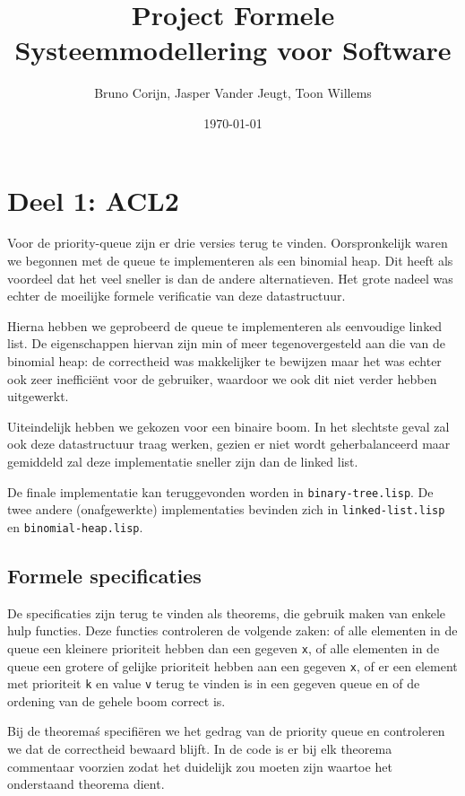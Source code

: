 \documentclass[a4paper,10pt]{article}
\title{Project Formele Systeemmodellering voor Software}
\author{Bruno Corijn, Jasper Vander Jeugt, Toon Willems}
\date{\today}
\begin{document}
\maketitle

\section{Deel 1: ACL2}

Voor de priority-queue zijn er drie versies terug te vinden. Oorspronkelijk
waren we begonnen met de queue te implementeren als een binomial heap. Dit heeft
als voordeel dat het veel sneller is dan de andere alternatieven. Het grote
nadeel was echter de moeilijke formele verificatie van deze datastructuur.

Hierna hebben we geprobeerd de queue te implementeren als eenvoudige linked
list. De eigenschappen hiervan zijn min of meer tegenovergesteld aan die van de
binomial heap: de correctheid was makkelijker te bewijzen maar het was echter
ook zeer ineffici\"ent voor de gebruiker, waardoor we ook dit niet verder hebben
uitgewerkt.

Uiteindelijk hebben we gekozen voor een binaire boom. In het slechtste geval zal
ook deze datastructuur traag werken, gezien er niet wordt geherbalanceerd maar
gemiddeld zal deze implementatie sneller zijn dan de linked list.

De finale implementatie kan teruggevonden worden in \texttt{binary-tree.lisp}.
De twee andere (onafgewerkte) implementaties bevinden zich in
\texttt{linked-list.lisp} en \texttt{binomial-heap.lisp}.

\subsection{Formele specificaties}

De specificaties zijn terug te vinden als theorems, die gebruik maken van enkele
hulp functies. Deze functies controleren de volgende zaken: of alle elementen in
de queue een kleinere prioriteit hebben dan een gegeven \texttt{x}, of alle
elementen in de queue een grotere of gelijke prioriteit hebben aan een gegeven
\texttt{x}, of er een element met prioriteit \texttt{k} en value \texttt{v}
terug te vinden is in een gegeven queue en of de ordening van de gehele boom
correct is.

Bij de theorema\'s specifi\"eren we het gedrag van de priority queue en
controleren we dat de correctheid bewaard blijft. In de code is er bij elk
theorema commentaar voorzien zodat het duidelijk zou moeten zijn waartoe het
onderstaand theorema dient.
\end{document}
